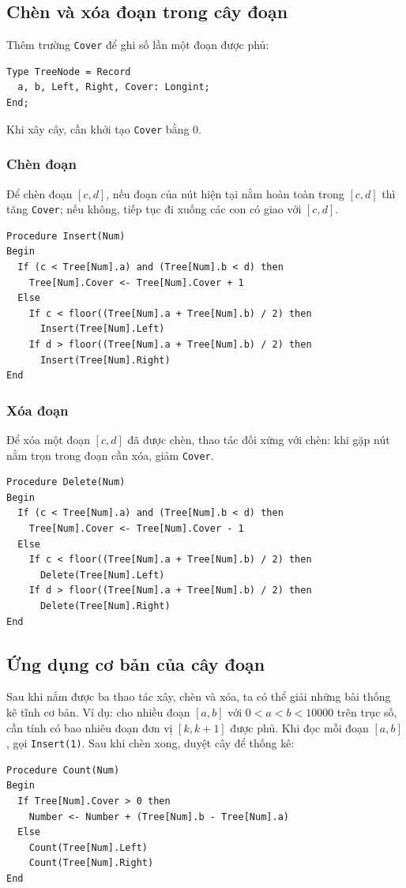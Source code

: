 \documentclass[11pt]{article}
\begin{document}
\subsection{Chèn và xóa đoạn trong cây đoạn}

Thêm trường \texttt{Cover} để ghi số lần một đoạn được phủ:
\begin{verbatim}
Type TreeNode = Record
  a, b, Left, Right, Cover: Longint;
End;
\end{verbatim}
Khi xây cây, cần khởi tạo \texttt{Cover} bằng $0$.

\subsubsection{Chèn đoạn}

Để chèn đoạn $[c,d]$, nếu đoạn của nút hiện tại nằm hoàn toàn trong $[c,d]$
thì tăng \texttt{Cover}; nếu không, tiếp tục đi xuống các con có giao với
$[c,d]$.
\begin{verbatim}
Procedure Insert(Num)
Begin
  If (c < Tree[Num].a) and (Tree[Num].b < d) then
    Tree[Num].Cover <- Tree[Num].Cover + 1
  Else
    If c < floor((Tree[Num].a + Tree[Num].b) / 2) then
      Insert(Tree[Num].Left)
    If d > floor((Tree[Num].a + Tree[Num].b) / 2) then
      Insert(Tree[Num].Right)
End
\end{verbatim}

\subsubsection{Xóa đoạn}

Để xóa một đoạn $[c,d]$ đã được chèn, thao tác đối xứng với chèn: khi gặp nút
nằm trọn trong đoạn cần xóa, giảm \texttt{Cover}.
\begin{verbatim}
Procedure Delete(Num)
Begin
  If (c < Tree[Num].a) and (Tree[Num].b < d) then
    Tree[Num].Cover <- Tree[Num].Cover - 1
  Else
    If c < floor((Tree[Num].a + Tree[Num].b) / 2) then
      Delete(Tree[Num].Left)
    If d > floor((Tree[Num].a + Tree[Num].b) / 2) then
      Delete(Tree[Num].Right)
End
\end{verbatim}

\subsection{Ứng dụng cơ bản của cây đoạn}

Sau khi nắm được ba thao tác xây, chèn và xóa, ta có thể giải những bài thống
kê tĩnh cơ bản. Ví dụ: cho nhiều đoạn $[a,b]$ với $0<a<b<10000$ trên trục số,
cần tính có bao nhiêu đoạn đơn vị $[k,k+1]$ được phủ. Khi đọc mỗi đoạn
$[a,b]$, gọi \texttt{Insert(1)}. Sau khi chèn xong, duyệt cây để thống kê:
\begin{verbatim}
Procedure Count(Num)
Begin
  If Tree[Num].Cover > 0 then
    Number <- Number + (Tree[Num].b - Tree[Num].a)
  Else
    Count(Tree[Num].Left)
    Count(Tree[Num].Right)
End
\end{verbatim}
\end{document}
